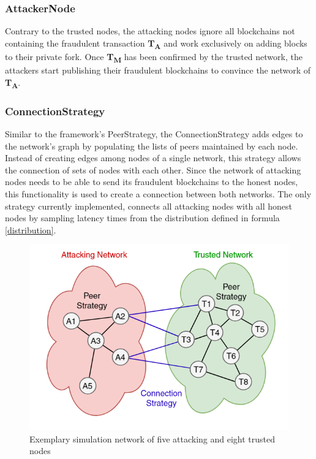 \documentclass[a4paper,12pt,twoside]{report}
\begin{document}
\subsubsection{AttackerNode}
Contrary to the trusted nodes, the attacking nodes ignore all blockchains not containing the fraudulent transaction \textbf{T\textsubscript{A}} and work exclusively on adding blocks to their private fork. Once \textbf{T\textsubscript{M}} has been confirmed by the trusted network, the attackers start publishing their fraudulent blockchains to convince the network of \textbf{T\textsubscript{A}}.
\subsubsection{ConnectionStrategy} \label{connstrat}
Similar to the framework's PeerStrategy, the ConnectionStrategy adds edges to the network's graph by populating the lists of peers maintained by each node. Instead of creating edges among nodes of a single network, this strategy allows the connection of sets of nodes with each other. Since the network of attacking nodes needs to be able to send its fraudulent blockchains to the honest nodes, this functionality is used to create a connection between both networks. The only strategy currently implemented, connects all attacking nodes with all honest nodes by sampling latency times from the distribution defined in formula \ref{distribution}.
\begin{figure}[ht]
	\centering
  \includegraphics[width=\textwidth]{Network.png}
	\caption{Exemplary simulation network of five attacking and eight trusted nodes}
	\label{network}
\end{figure}
\end{document}
